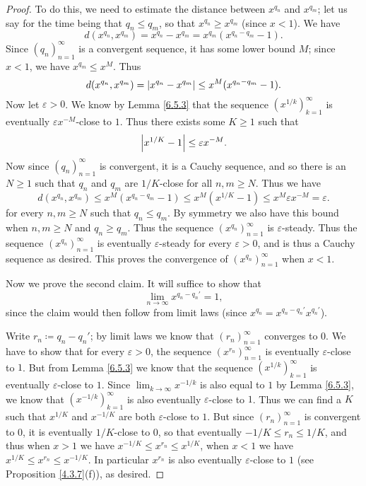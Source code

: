 \begin{proof}
    To do this, we need to estimate the distance between \(x^{q_n}\) and \(x^{q_m}\);
    let us say for the time being that \(q_n \leq q_m\), so that \(x^{q_n} \geq x^{q_m}\) (since \(x < 1\)).
    We have
    \[
        d(x^{q_n}, x^{q_m}) = x^{q_n} - x^{q_m} = x^{q_m} (x^{q_n - q_m} - 1).
    \]
    Since \((q_n)_{n = 1}^\infty\) is a convergent sequence, it has some lower bound \(M\);
    since \(x < 1\), we have \(x^{q_m} \leq x^M\).
    Thus
    \[
        d(x^{q_n}, x^{q_m}) = \left\lvert x^{q_n} - x^{q_m}\right\rvert \leq x^M (x^{q_n - q_m} - 1).
    \]
    Now let \(\varepsilon > 0\).
    We know by Lemma \ref{6.5.3} that the sequence \((x^{1 / k})_{k = 1}^\infty\) is eventually \(\varepsilon x^{-M}\)-close to \(1\).
    Thus there exists some \(K \geq 1\) such that
    \[
        \left\lvert x^{1 / K} - 1\right\rvert \leq \varepsilon x^{-M}.
    \]
    Now since \((q_n)_{n = 1}^\infty\) is convergent, it is a Cauchy sequence, and so there is an \(N \geq 1\) such that \(q_n\) and \(q_m\) are \(1 / K\)-close for all \(n, m \geq N\).
    Thus we have
    \[
        d(x^{q_n}, x^{q_m}) \leq x^M (x^{q_n - q_m} - 1) \leq x^M (x^{1 / K} - 1) \leq x^M \varepsilon x^{-M} = \varepsilon.
    \]
    for every \(n, m \geq N\) such that \(q_n \leq q_m\).
    By symmetry we also have this bound when \(n, m \geq N\) and \(q_n \geq q_m\).
    Thus the sequence \((x^{q_n})_{n = 1}^\infty\) is \(\varepsilon\)-steady.
    Thus the sequence \((x^{q_n})_{n = 1}^\infty\) is eventually \(\varepsilon\)-steady for every \(\varepsilon > 0\), and is thus a Cauchy sequence as desired.
    This proves the convergence of \((x^{q_n})_{n = 1}^\infty\) when \(x < 1\).

    Now we prove the second claim.
    It will suffice to show that
    \[
        \lim_{n \to \infty} x^{q_n - q_n'} = 1,
    \]
    since the claim would then follow from limit laws
    (since \(x^{q_n} = x^{q_n - q_n'} x^{q_n'}\)).

    Write \(r_n \coloneqq q_n - q_n'\);
    by limit laws we know that \((r_n)_{n = 1}^\infty\) converges to \(0\).
    We have to show that for every \(\varepsilon > 0\), the sequence \((x^{r_n})_{n = 1}^\infty\) is eventually \(\varepsilon\)-close to \(1\).
    But from Lemma \ref{6.5.3} we know that the sequence \((x^{1 / k})_{k = 1}^\infty\) is eventually \(\varepsilon\)-close to \(1\).
    Since \(\lim_{k \to \infty} x^{-1 / k}\) is also equal to \(1\) by Lemma \ref{6.5.3}, we know that \((x^{-1 / k})_{k = 1}^\infty\) is also eventually \(\varepsilon\)-close to \(1\).
    Thus we can find a \(K\) such that \(x^{1 / K}\) and \(x^{-1 / K}\) are both \(\varepsilon\)-close to \(1\).
    But since \((r_n)_{n = 1}^\infty\) is convergent to \(0\), it is eventually \(1 / K\)-close to \(0\), so that eventually \(-1 / K \leq r_n \leq 1 / K\), and thus when \(x > 1\) we have \(x^{-1 / K} \leq x^{r_n} \leq x^{1 / K}\), when \(x < 1\) we have \(x^{1 / K} \leq x^{r_n} \leq x^{-1 / K}\).
    In particular \(x^{r_n}\) is also eventually \(\varepsilon\)-close to \(1\) (see Proposition \ref{4.3.7}(f)), as desired.
\end{proof}

